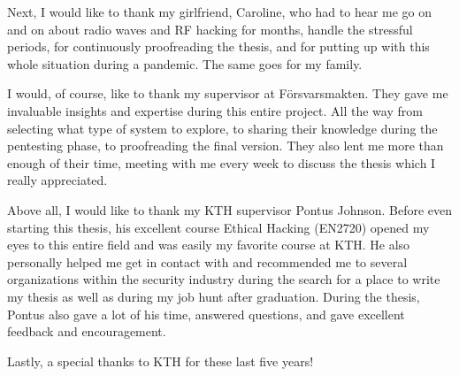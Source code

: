 Next, I would like to thank my girlfriend, Caroline, who had to hear me go on and on about radio waves and RF hacking for months, handle the stressful periods, for continuously proofreading the thesis, and for putting up with this whole situation during a pandemic. The same goes for my family.

I would, of course, like to thank my supervisor at Försvarsmakten. They gave me invaluable insights and expertise during this entire project. All the way from selecting what type of system to explore, to sharing their knowledge during the pentesting phase, to proofreading the final version. They also lent me more than enough of their time, meeting with me every week to discuss the thesis which I really appreciated.

Above all, I would like to thank my KTH supervisor Pontus Johnson. Before even starting this thesis, his excellent course Ethical Hacking (EN2720) opened my eyes to this entire field and was easily my favorite course at KTH. He also personally helped me get in contact with and recommended me to several organizations within the security industry during the search for a place to write my thesis as well as during my job hunt after graduation. During the thesis, Pontus also gave a lot of his time, answered questions, and gave excellent feedback and encouragement.

Lastly, a special thanks to KTH for these last five years!

\acknowlegmentssignature

\tableofcontents
\markboth{\contentsname}{}

\clearpage\listoffigures
\clearpage\listoftables
\clearpage\printglossary[type=\acronymtype, title={List of acronyms and abbreviations}]
